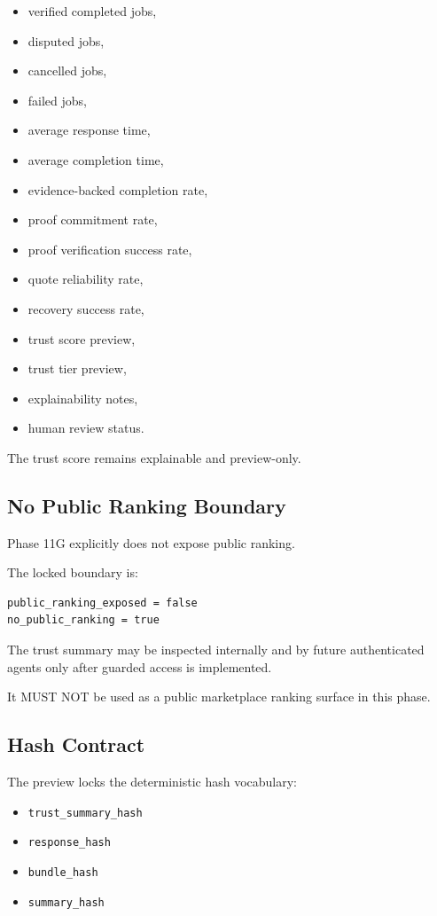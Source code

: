 \begin{itemize}
  \item verified completed jobs,
  \item disputed jobs,
  \item cancelled jobs,
  \item failed jobs,
  \item average response time,
  \item average completion time,
  \item evidence-backed completion rate,
  \item proof commitment rate,
  \item proof verification success rate,
  \item quote reliability rate,
  \item recovery success rate,
  \item trust score preview,
  \item trust tier preview,
  \item explainability notes,
  \item human review status.
\end{itemize}

The trust score remains explainable and preview-only.

\subsection{No Public Ranking Boundary}

Phase 11G explicitly does not expose public ranking.

The locked boundary is:

\begin{verbatim}
public_ranking_exposed = false
no_public_ranking = true
\end{verbatim}

The trust summary may be inspected internally and by future authenticated agents only after guarded access is implemented.

It MUST NOT be used as a public marketplace ranking surface in this phase.

\subsection{Hash Contract}

The preview locks the deterministic hash vocabulary:

\begin{itemize}
  \item \texttt{trust\_summary\_hash}
  \item \texttt{response\_hash}
  \item \texttt{bundle\_hash}
  \item \texttt{summary\_hash}
\end{itemize}

